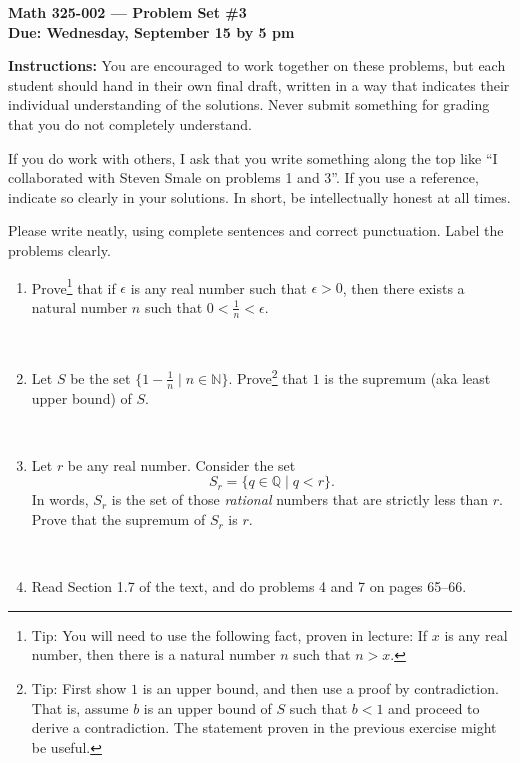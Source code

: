 \documentclass{amsart}
\def\N{\mathbb N}
\def\Q{\mathbb Q}
\def\e{\epsilon}
\begin{document}
\begin{center}
{\large\bfseries
Math 325-002 --- Problem Set \#3 \\
Due: Wednesday, September 15 by 5 pm}
\end{center}





{\bf Instructions:} You are encouraged to work together on these
problems, but each student should hand in their own final draft,
written in a way that indicates their individual understanding of
the solutions. Never submit something for grading
that you do not completely understand. 

If you do work with others, I ask that you write something along the
top like ``I collaborated with Steven Smale on problems 1 and 3''.
If you use a reference, indicate so clearly in your solutions. 
In short, be intellectually
honest at all times.

Please write neatly, using complete sentences and correct
punctuation. Label the problems clearly. 






\begin{enumerate}
\item Prove\footnote{Tip: You will need to use the following fact, proven in lecture: If $x$ is any real number, then there is a natural number $n$ such that $n > x$.}
 that if $\e$ is any real number such that $\e > 0$, then there 
exists  a natural number $n$ such that $0 < \frac{1}{n} < \e$.

\

\item Let $S$ be the set $\{1 - \frac{1}{n} \mid n \in \N\}$. Prove\footnote{Tip: First show $1$ is an upper bound, and then use a proof by contradiction. That is, assume $b$ is an upper bound of $S$ 
such that $b < 1$ and  proceed to derive a contradiction. The statement proven in the previous exercise might be useful.}
 that $1$ is the supremum (aka least upper bound) of $S$.


\


\item Let $r$ be any real number. Consider the set
$$
S_r = \{q \in \Q \mid q < r\}.
$$
In words, $S_r$ is the set of those {\em rational} numbers that are
strictly less
than $r$. Prove that the supremum of $S_r$ is $r$. 

\

\item Read Section 1.7 of the text, and do problems 4 and 7 on pages 65--66.




\end{enumerate}
\end{document}

